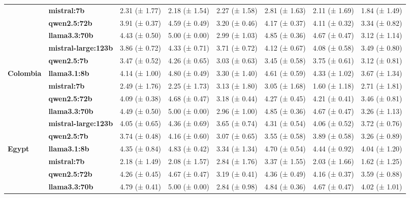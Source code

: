 \begin{tabular}{llllllll}
\textbf{} & \textbf{mistral:7b} & 2.31 (± 1.77) & 2.18 (± 1.54) & 2.27 (± 1.58) & 2.81 (± 1.63) & 2.11 (± 1.69) & 1.84 (± 1.49) \\
\textbf{} & \textbf{qwen2.5:72b} & 3.91 (± 0.37) & 4.59 (± 0.49) & 3.20 (± 0.46) & 4.17 (± 0.37) & 4.11 (± 0.32) & 3.34 (± 0.82) \\
\textbf{} & \textbf{llama3.3:70b} & 4.43 (± 0.50) & 5.00 (± 0.00) & 2.99 (± 1.03) & 4.85 (± 0.36) & 4.67 (± 0.47) & 3.12 (± 1.14) \\
\textbf{} & \textbf{mistral-large:123b} & 3.86 (± 0.72) & 4.33 (± 0.71) & 3.71 (± 0.72) & 4.12 (± 0.67) & 4.08 (± 0.58) & 3.49 (± 0.80) \\
\textbf{} & \textbf{qwen2.5:7b} & 3.47 (± 0.52) & 4.26 (± 0.65) & 3.03 (± 0.63) & 3.45 (± 0.58) & 3.75 (± 0.61) & 3.12 (± 0.81) \\
\cline{1-8}
\multirow[t]{6}{*}{\textbf{Colombia}} & \textbf{llama3.1:8b} & 4.14 (± 1.00) & 4.80 (± 0.49) & 3.30 (± 1.40) & 4.61 (± 0.59) & 4.33 (± 1.02) & 3.67 (± 1.34) \\
\textbf{} & \textbf{mistral:7b} & 2.49 (± 1.76) & 2.25 (± 1.73) & 3.13 (± 1.80) & 3.05 (± 1.68) & 1.60 (± 1.18) & 2.71 (± 1.81) \\
\textbf{} & \textbf{qwen2.5:72b} & 4.09 (± 0.38) & 4.68 (± 0.47) & 3.18 (± 0.44) & 4.27 (± 0.45) & 4.21 (± 0.41) & 3.46 (± 0.81) \\
\textbf{} & \textbf{llama3.3:70b} & 4.49 (± 0.50) & 5.00 (± 0.00) & 2.96 (± 1.00) & 4.85 (± 0.36) & 4.67 (± 0.47) & 3.26 (± 1.13) \\
\textbf{} & \textbf{mistral-large:123b} & 4.05 (± 0.65) & 4.36 (± 0.69) & 3.65 (± 0.74) & 4.31 (± 0.54) & 4.06 (± 0.52) & 3.72 (± 0.76) \\
\textbf{} & \textbf{qwen2.5:7b} & 3.74 (± 0.48) & 4.16 (± 0.60) & 3.07 (± 0.65) & 3.55 (± 0.58) & 3.89 (± 0.58) & 3.26 (± 0.89) \\
\cline{1-8}
\multirow[t]{6}{*}{\textbf{Egypt}} & \textbf{llama3.1:8b} & 4.35 (± 0.84) & 4.83 (± 0.42) & 3.34 (± 1.34) & 4.70 (± 0.54) & 4.44 (± 0.92) & 4.04 (± 1.20) \\
\textbf{} & \textbf{mistral:7b} & 2.18 (± 1.49) & 2.08 (± 1.57) & 2.84 (± 1.76) & 3.37 (± 1.55) & 2.03 (± 1.66) & 1.62 (± 1.25) \\
\textbf{} & \textbf{qwen2.5:72b} & 4.26 (± 0.45) & 4.67 (± 0.47) & 3.19 (± 0.41) & 4.36 (± 0.49) & 4.16 (± 0.37) & 3.59 (± 0.88) \\
\textbf{} & \textbf{llama3.3:70b} & 4.79 (± 0.41) & 5.00 (± 0.00) & 2.84 (± 0.98) & 4.84 (± 0.36) & 4.67 (± 0.47) & 4.02 (± 1.01) \\

\end{tabular}
